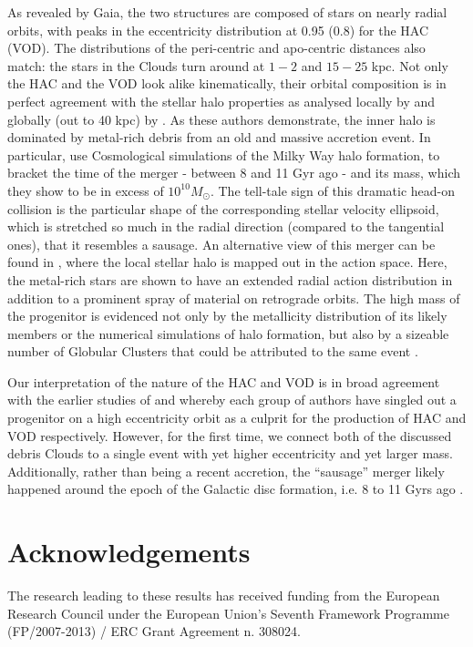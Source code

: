 \documentclass[fleqn,usenatbib]{mnras}
\begin{document}
As revealed by Gaia, the two structures are composed of stars on
nearly radial orbits, with peaks in the eccentricity distribution at
0.95 (0.8) for the HAC (VOD). The distributions of the peri-centric
and apo-centric distances also match: the stars in the Clouds turn
around at $1-2$ and $15-25$ kpc. Not only the HAC and the VOD look
alike kinematically, their orbital composition is in perfect agreement
with the stellar halo properties as analysed locally by
\citet{Belokurov2018} and globally (out to 40 kpc) by
\citet{Deason2018pileup}. As these authors demonstrate, the inner halo
is dominated by metal-rich debris from an old and massive accretion
event. In particular, \citet{Belokurov2018} use Cosmological
simulations of the Milky Way halo formation, to bracket the time of
the merger - between 8 and 11 Gyr ago - and its mass, which they show
to be in excess of $10^{10} M_{\odot}$. The tell-tale sign of this
dramatic head-on collision is the particular shape of the
corresponding stellar velocity ellipsoid, which is stretched so much
in the radial direction (compared to the tangential ones), that it
resembles a sausage. An alternative view of this merger can be found
in \citet{actionhalo}, where the local stellar halo is mapped out in
the action space. Here, the metal-rich stars are shown to have an
extended radial action distribution in addition to a prominent spray
of material on retrograde orbits. The high mass of the progenitor is
evidenced not only by the metallicity distribution of its likely
members or the numerical simulations of halo formation, but also by a
sizeable number of Globular Clusters that could be attributed to the
same event \citep[see][]{sausagegc,Kruijssen2018}.

Our interpretation of the nature of the HAC and VOD is in broad
agreement with the earlier studies of \citet{Jo2012} and \citet{Ca12}
whereby each group of authors have singled out a progenitor on a high
eccentricity orbit as a culprit for the production of HAC and VOD
respectively. However, for the first time, we connect both of the
discussed debris Clouds to a single event with yet higher eccentricity
and yet larger mass. Additionally, rather than being a recent
accretion, the ``sausage'' merger likely happened around the epoch of
the Galactic disc formation, i.e. 8 to 11 Gyrs ago
\citep[see][]{Belokurov2018}.

\section*{Acknowledgements}

The research leading to these results has received funding from the
European Research Council under the European Union's Seventh Framework
Programme (FP/2007-2013) / ERC Grant Agreement n. 308024.





\bsp	%
\label{lastpage}
\end{document}
